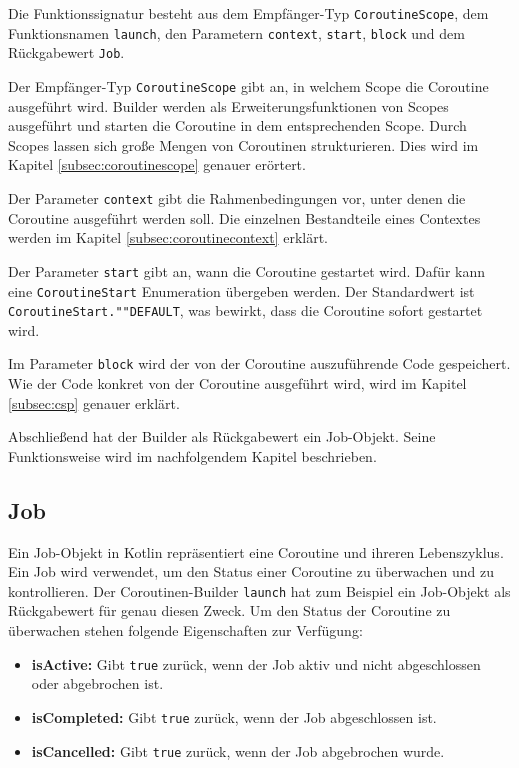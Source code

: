 \documentclass[fontsize=12pt,paper=a4,twoside=semi,parskip=half-,headsepline,headinclude]{scrreprt}
\begin{document}
Die Funktionssignatur besteht aus dem Empfänger-Typ \texttt{CoroutineScope}, dem Funktionsnamen \texttt{launch}, den Parametern \texttt{context}, \texttt{start}, \texttt{block} und dem Rückgabewert \texttt{Job}.

Der Empfänger-Typ \texttt{CoroutineScope} gibt an, in welchem Scope die Coroutine ausgeführt wird. Builder werden als Erweiterungsfunktionen von Scopes ausgeführt und starten die Coroutine in dem entsprechenden Scope. Durch Scopes lassen sich große Mengen von Coroutinen strukturieren. Dies wird im Kapitel \ref{subsec:coroutinescope} genauer erörtert.

Der Parameter \texttt{context} gibt die Rahmenbedingungen vor, unter denen die Coroutine ausgeführt werden soll. Die einzelnen Bestandteile eines Contextes werden im Kapitel \ref{subsec:coroutinecontext} erklärt.

Der Parameter \texttt{start} gibt an, wann die Coroutine gestartet wird. Dafür kann eine \texttt{CoroutineStart} Enumeration übergeben werden. Der Standardwert ist \texttt{CoroutineStart.""DEFAULT}, was bewirkt, dass die Coroutine sofort gestartet wird.

Im Parameter \texttt{block} wird der von der Coroutine auszuführende Code gespeichert. Wie der Code konkret von der Coroutine ausgeführt wird, wird im Kapitel \ref{subsec:csp} genauer erklärt.

Abschließend hat der Builder als Rückgabewert ein Job-Objekt. Seine Funktionsweise wird im nachfolgendem Kapitel beschrieben.


\subsection{Job}

Ein Job-Objekt in Kotlin repräsentiert eine Coroutine und ihreren Lebenszyklus. Ein Job wird verwendet, um den Status einer Coroutine zu überwachen und zu kontrollieren. Der Coroutinen-Builder \texttt{launch} hat zum Beispiel ein Job-Objekt als Rückgabewert für genau diesen Zweck. Um den Status der Coroutine zu überwachen stehen folgende Eigenschaften zur Verfügung:

\begin{itemize}
	\item \textbf{isActive:} Gibt \texttt{true} zurück, wenn der Job aktiv und nicht abgeschlossen oder abgebrochen ist.
	\item \textbf{isCompleted:} Gibt \texttt{true} zurück, wenn der Job abgeschlossen ist.
	\item \textbf{isCancelled:} Gibt \texttt{true} zurück, wenn der Job abgebrochen wurde.
\end{itemize}
\end{document}
